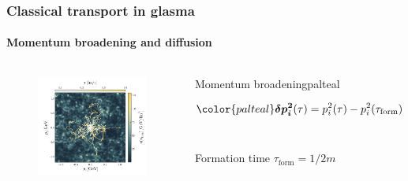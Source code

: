 \documentclass[aspectratio=169,11pt,usenames,dvipsnames]{beamer}
\begin{document}
\begin{frame}
\frametitle{Classical transport in glasma}
\framesubtitle{Momentum broadening and diffusion}
    \begin{columns}[onlytextwidth,t]
            \begin{center}
                \begin{figure}
                    \centering
                    \vspace{-35pt}
                    \includegraphics[width=1.15\textwidth]{images/hqs_trajectories.png}
                \end{figure}
            \end{center}
            \begin{center}
                \begin{custombox2}{Momentum broadening}{palteal}
                    \small
                    \begin{varwidth}{0.92\textwidth}
                    \vspace{-5pt}
                    $${\color{palteal}\boldsymbol{\delta p^2_i}}(\tau)=p^2_i(\tau)-p^2_i(\tau_\mathrm{form})$$
                    \\[-25pt]
                    {\begin{center}\scriptsize\color{lightgray} Formation time $\tau_\mathrm{form}=1/2m$ \end{center}}    

\end{varwidth}
\end{custombox2}
\end{center}
\end{columns}
\end{frame}
\end{document}
